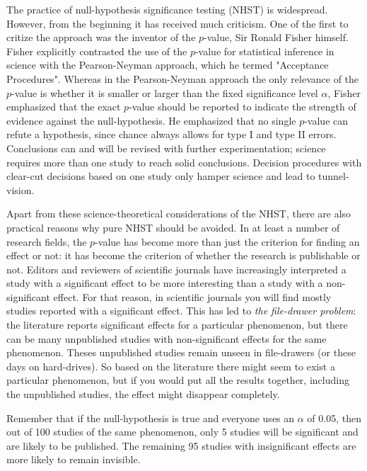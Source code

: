 \documentclass[]{report}\usepackage[]{graphicx}\usepackage[]{color}
\begin{document}
The practice of null-hypothesis significance testing (NHST) is widespread. However, from the beginning it has received much criticism. One of the first to critize the approach was the inventor of the $p$-value, Sir Ronald Fisher himself. Fisher explicitly contrasted the use of the $p$-value for statistical inference in science with the Pearson-Neyman approach, which he termed "Acceptance Procedures". Whereas in the Pearson-Neyman approach the only relevance of the $p$-value is whether it is smaller or larger than the fixed significance level $\alpha$, Fisher emphasized that the exact $p$-value should be reported to indicate the strength of evidence against the null-hypothesis. He emphasized that no single $p$-value can refute a hypothesis, since chance always allows for type I and type II errors. Conclusions can and will be revised with further experimentation; science requires more than one study to reach solid conclusions. Decision procedures with clear-cut decisions based on one study only hamper science and lead to tunnel-vision.

Apart from these science-theoretical considerations of the NHST, there are also practical reasons why pure NHST should be avoided. In at least a number of research fields, the $p$-value has become more than just the criterion for finding an effect or not: it has become the criterion of whether the research is publishable or not. Editors and reviewers of scientific journals have increasingly interpreted a study with a significant effect to be more interesting than a study with a non-significant effect. For that reason, in scientific journals you will find mostly studies reported with a significant effect. This has led to \textit{the file-drawer problem}: the literature reports significant effects for a particular phenomenon, but there can be many unpublished studies with non-significant effects for the same phenomenon. Theses unpublished studies remain unseen in file-drawers (or these days on hard-drives). So based on the literature there might seem to exist a particular phenomenon, but if you would put all the results together, including the unpublished studies, the effect might disappear completely.

Remember that if the null-hypothesis is true and everyone uses an $\alpha$ of 0.05, then out of 100 studies of the same phenomenon, only 5 studies will be significant and are likely to be published. The remaining 95 studies with insignificant effects are more likely to remain invisible. 
\end{document}
